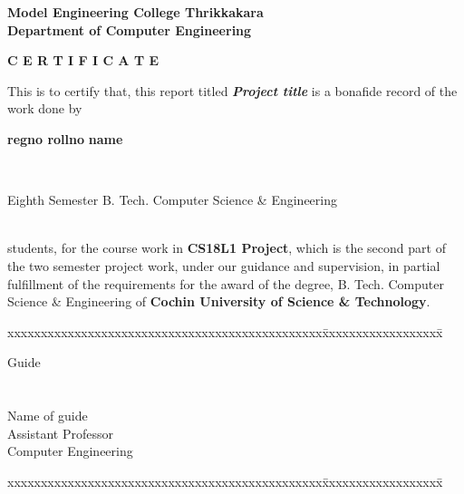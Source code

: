 \documentclass[11pt]{report}
\begin{document}
\begin{titlepage}
\begin{center}
\Large{\textbf{Model Engineering College Thrikkakara}}\\
\Large{\textbf{Department of Computer Engineering}}\\
\end{center}
\begin{figure}[h]
\begin{center}
\end{center}
\end{figure}
\begin{center}
\Large{\textbf{C E R T I F I C A T E}}\\
\vspace{.1in}
\end{center}
This is to certify that, this report titled \textbf{\textit{Project title}} is a bonafide record of the work done by\\
\centerline{\Large{\textbf{regno rollno}}	\hspace{.1in}	\Large{\textbf{name}}}\\ 
\centerline {\textsf{Eighth Semester B. Tech. Computer Science \& Engineering}}\\
students,  for the course work in \textbf{CS18L1 Project}, which is the second part of the two semester project work, under our guidance and supervision, in partial 
 fulfillment of the requirements for the award of the degree, B. Tech. Computer 
Science \& Engineering of \textbf{Cochin University of Science \& Technology}.
\vspace{.1in}
\begin{tabbing}
xxxxxxxxxxxxxxxxxxxxxxxxxxxxxxxxxxxxxxxxxxxxxxx\= xxxxxxxxxxxxxxxxxx\= \kill

Guide		\>				
\\
\\
\\
Name of guide \>\>\\
Assistant Professor	\>\>\\
Computer Engineering	\>\>	
\end{tabbing}
\vspace{.1in}
\begin{tabbing}
xxxxxxxxxxxxxxxxxxxxxxxxxxxxxxxxxxxxxxxxxxxxxxx\= xxxxxxxxxxxxxxxxxx\= \kill


\end{tabbing}
\end{titlepage}
\end{document}
